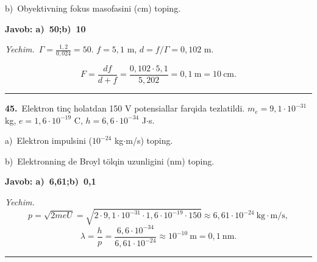 \documentclass[11pt,a4paper]{article}
\begin{document}
\noindent\hspace*{4mm}b)\ Obyektivning fokus masofasini (cm) toping.\par
\noindent\colorbox{gray!12}{\parbox{\dimexpr\linewidth-2\fboxsep}{\textbf{Javob: a)\ 50;\quad b)\ 10}}}\par\smallskip
\noindent\textit{Yechim.}\ $\Gamma=\frac{1{,}2}{0{,}024}=50$. $f=5{,}1$ m, $d=f/\Gamma=0{,}102$ m.\par
\[F=\frac{df}{d+f}=\frac{0{,}102\cdot5{,}1}{5{,}202}=0{,}1\ \text{m}=10\ \text{cm}.\]\par\medskip\hrule\medskip
{}\noindent\textbf{45.}\ Elektron tinç holatdan 150 V potensiallar farqida tezlatildi. $m_e=9{,}1\cdot10^{-31}$ kg, $e=1{,}6\cdot10^{-19}$ C, $h=6{,}6\cdot10^{-34}$ J$\cdot$s.\par
\noindent\hspace*{4mm}a)\ Elektron impulsini ($10^{-24}$ kg$\cdot$m/s) toping.\par
\noindent\hspace*{4mm}b)\ Elektronning de Broyl tölqin uzunligini (nm) toping.\par
\noindent\colorbox{gray!12}{\parbox{\dimexpr\linewidth-2\fboxsep}{\textbf{Javob: a)\ 6,61;\quad b)\ 0,1}}}\par\smallskip
\noindent\textit{Yechim.}\ \[p=\sqrt{2meU}=\sqrt{2\cdot9{,}1\cdot10^{-31}\cdot1{,}6\cdot10^{-19}\cdot150}\approx6{,}61\cdot10^{-24}\ \text{kg}\cdot\text{m/s},\]
\[\lambda=\frac{h}{p}=\frac{6{,}6\cdot10^{-34}}{6{,}61\cdot10^{-24}}\approx10^{-10}\ \text{m}=0{,}1\ \text{nm}.\]\par\medskip\hrule\medskip
\end{document}
